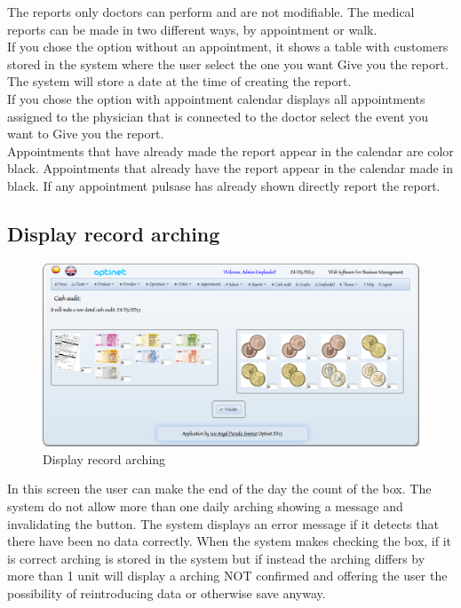 \documentclass[a4paper,11pt]{book}
\begin{document}
The reports only doctors can perform and are not modifiable. The medical reports can be made in two different ways, by appointment or walk.\\If you chose the option without an appointment, it shows a table with customers stored in the system where the user select the one you want Give you the report. The system will store a date at the time of creating the report.\\If you chose the option with appointment calendar displays all appointments assigned to the physician that is connected to the doctor select the event you want to Give you the report.\\Appointments that have already made the report appear in the calendar are color black. Appointments that already have the report appear in the calendar made in black. If any appointment pulsase has already shown directly report the report.


\newpage
\subsection {Display record arching}

\begin{figure}[!htb]
  \centering
    \includegraphics[scale=0.35]{icapnuevoarqueo.png}
  \caption{Display record arching}
  \label{a}
\end{figure}

In this screen the user can make the end of the day the count of the box. The system do not allow more than one daily arching showing a message and invalidating the button. The system displays an error message if it detects that there have been no data correctly. When the system makes checking the box, if it is correct arching is stored in the system but if instead the arching differs by more than 1 unit will display a arching NOT confirmed and offering the user the possibility of reintroducing data or otherwise save anyway.
\end{document}
